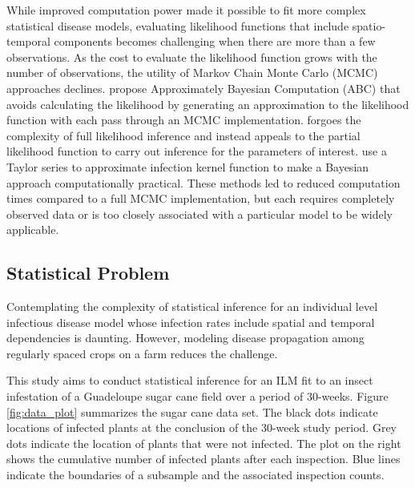 \documentclass{uwstat572}
\begin{document}
While improved computation power made it possible to fit more complex statistical disease models, evaluating likelihood functions that include spatio-temporal components becomes challenging when there are more than a few observations. 
As the cost to evaluate the likelihood function grows with the number of observations, the utility of Markov Chain Monte Carlo (MCMC) approaches declines.
\citet{McKinley} propose Approximately Bayesian Computation (ABC) that avoids calculating the likelihood by generating an approximation to the likelihood function with each pass through an MCMC implementation. 
\citet{Diggle} forgoes the complexity of full likelihood inference and instead appeals to the partial likelihood function to carry out inference for the parameters of interest. 
\citet{Deardon} use a Taylor series to approximate infection kernel function to make a Bayesian approach computationally practical. 
These methods led to reduced computation times compared to a full MCMC implementation, but each requires completely observed data or is too closely associated with a particular model to be widely applicable.

\subsection{Statistical Problem}
Contemplating the complexity of statistical inference for an individual level infectious disease model whose infection rates include spatial and temporal dependencies is daunting.
However, modeling disease propagation among regularly spaced crops on a farm reduces the challenge. 

This study aims to conduct statistical inference for an ILM fit to an insect infestation of a Guadeloupe sugar cane field over a period of 30-weeks.
Figure \ref{fig:data_plot} summarizes the sugar cane data set. 
The black dots indicate locations of infected plants at the conclusion of the 30-week study period. 
Grey dots indicate the location of plants that were not infected. 
The plot on the right shows the cumulative number of infected plants after each inspection.
Blue lines indicate the boundaries of a subsample and the associated inspection counts. 
\end{document}
